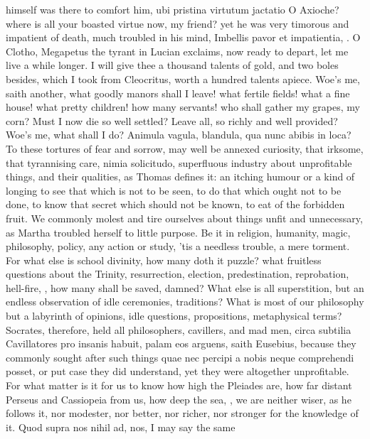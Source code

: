 {himself was there to comfort him, ubi pristina virtutum jactatio O
Axioche? where is all your boasted virtue now, my friend? yet he was
very timorous and impatient of death, much troubled in his mind,
Imbellis pavor et impatientia, \etc{}. O Clotho, Megapetus the tyrant in
Lucian exclaims, now ready to depart, let me live a while longer.
I will give thee a thousand talents of gold, and two boles
besides, which I took from Cleocritus, worth a hundred talents apiece.
Woe's me,  saith another, what goodly manors shall I leave! what
fertile fields! what a fine house! what pretty children! how many
servants! who shall gather my grapes, my corn? Must I now die so well
settled? Leave all, so richly and well provided? Woe's me, what shall I
do? Animula vagula, blandula, qua nunc abibis in loca?
To these tortures of fear and sorrow, may well be annexed curiosity,
that irksome, that tyrannising care, nimia solicitudo,
superfluous industry about unprofitable things, and their
qualities, as Thomas defines it: an itching humour or a kind of longing
to see that which is not to be seen, to do that which ought not to be
done, to know that secret which should not be known, to eat of
the forbidden fruit. We commonly molest and tire ourselves about things
unfit and unnecessary, as Martha troubled herself to little purpose. Be
it in religion, humanity, magic, philosophy, policy, any action or
study, 'tis a needless trouble, a mere torment. For what else is school
divinity, how many doth it puzzle? what fruitless questions about the
Trinity, resurrection, election, predestination, reprobation,
hell-fire, \etc{}, how many shall be saved, damned? What else is all
superstition, but an endless observation of idle ceremonies,
traditions? What is most of our philosophy but a labyrinth of opinions,
idle questions, propositions, metaphysical terms? Socrates, therefore,
held all philosophers, cavillers, and mad men, circa subtilia
Cavillatores pro insanis habuit, palam eos arguens, saith
Eusebius, because they commonly sought after such things quae nec
percipi a nobis neque comprehendi posset, or put case they did
understand, yet they were altogether unprofitable. For what matter is
it for us to know how high the Pleiades are, how far distant Perseus
and Cassiopeia from us, how deep the sea, \etc{}, we are neither wiser, as
he follows it, nor modester, nor better, nor richer, nor stronger for
the knowledge of it. Quod supra nos nihil ad, nos, I may say the same
}
